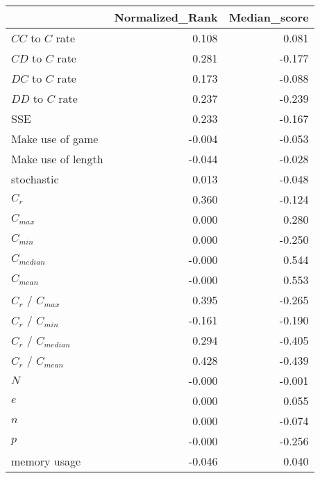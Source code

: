 \begin{tabular}{lrr}
\toprule
{} &  Normalized_Rank &  Median_score \\
\midrule
$CC$ to $C$ rate     &            0.108 &         0.081 \\
$CD$ to $C$ rate     &            0.281 &        -0.177 \\
$DC$ to $C$ rate     &            0.173 &        -0.088 \\
$DD$ to $C$ rate     &            0.237 &        -0.239 \\
SSE                  &            0.233 &        -0.167 \\
Make use of game     &           -0.004 &        -0.053 \\
Make use of length   &           -0.044 &        -0.028 \\
stochastic           &            0.013 &        -0.048 \\
$C_r$                &            0.360 &        -0.124 \\
$C_{max}$            &            0.000 &         0.280 \\
$C_{min}$            &            0.000 &        -0.250 \\
$C_{median}$         &           -0.000 &         0.544 \\
$C_{mean}$           &           -0.000 &         0.553 \\
$C_r$ / $C_{max}$    &            0.395 &        -0.265 \\
$C_r$ / $C_{min}$    &           -0.161 &        -0.190 \\
$C_r$ / $C_{median}$ &            0.294 &        -0.405 \\
$C_r$ / $C_{mean}$   &            0.428 &        -0.439 \\
$N$                  &           -0.000 &        -0.001 \\
$e$                  &            0.000 &         0.055 \\
$n$                  &            0.000 &        -0.074 \\
$p$                  &           -0.000 &        -0.256 \\
memory usage         &           -0.046 &         0.040 \\
\bottomrule
\end{tabular}
